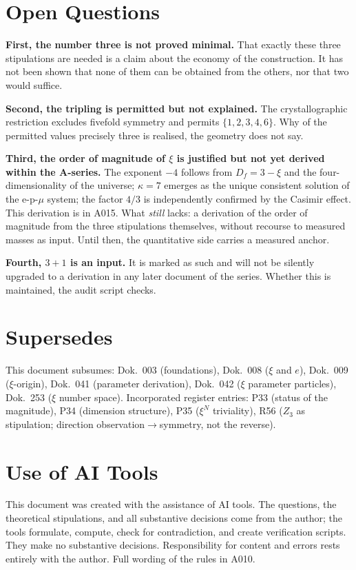\section{Open Questions}

\textbf{First, the number three is not proved minimal.} That exactly these
three stipulations are needed is a claim about the economy of the construction.
It has not been shown that none of them can be obtained from the others, nor
that two would suffice.

\textbf{Second, the tripling is permitted but not explained.} The crystallographic
restriction excludes fivefold symmetry and permits $\{1,2,3,4,6\}$. Why of
the permitted values precisely three is realised, the geometry does not say.

\textbf{Third, the order of magnitude of $\xi$ is justified but not yet
derived within the A-series.} The exponent $-4$ follows from $D_f=3-\xi$ and
the four-dimensionality of the universe; $\kappa=7$ emerges as the unique
consistent solution of the e-p-$\mu$ system; the factor $4/3$ is independently
confirmed by the Casimir effect. This derivation is in A015. What \emph{still}
lacks: a derivation of the order of magnitude from the three stipulations
themselves, without recourse to measured masses as input. Until then, the
quantitative side carries a measured anchor.

\textbf{Fourth, $3+1$ is an input.} It is marked as such and will not be
silently upgraded to a derivation in any later document of the series.
Whether this is maintained, the audit script checks.

\section{Supersedes}

This document subsumes: Dok.~003 (foundations), Dok.~008 ($\xi$ and $e$),
Dok.~009 ($\xi$-origin), Dok.~041 (parameter derivation), Dok.~042 ($\xi$
parameter particles), Dok.~253 ($\xi$ number space). Incorporated register
entries: P33 (status of the magnitude), P34 (dimension structure), P35
($\xi^N$ triviality), R56 ($Z_3$ as stipulation; direction observation$\to$symmetry,
not the reverse).

\section{Use of AI Tools}

This document was created with the assistance of AI tools. The questions,
the theoretical stipulations, and all substantive decisions come from the
author; the tools formulate, compute, check for contradiction, and create
verification scripts. They make no substantive decisions.
Responsibility for content and errors rests entirely with the author.
Full wording of the rules in A010.
